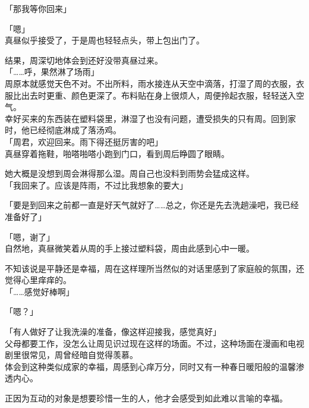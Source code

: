 「那我等你回来」

「嗯」\\

真昼似乎接受了，于是周也轻轻点头，带上包出门了。\\

\vspace{2\baselineskip}

结果，周深切地体会到还好没带真昼过来。\\

「……呼，果然淋了场雨」\\

周原本就感觉天色不对。不出所料，雨水接连从天空中滴落，打湿了周的衣服，衣服比出去时更重、颜色更深了。布料贴在身上很烦人，周便拎起衣服，轻轻送入空气。\\

幸好买来的东西装在塑料袋里，淋湿了也没有问题，遭受损失的只有周。回到家时，他已经彻底淋成了落汤鸡。\\

「周君，欢迎回来。雨下得还挺厉害的吧」\\

真昼穿着拖鞋，啪嗒啪嗒小跑到门口，看到周后睁圆了眼睛。

她大概是没想到周会淋得那么湿。周自己也没料到雨势会猛成这样。\\

「我回来了。应该是阵雨，不过比我想象的要大」

「要是到回来之前都一直是好天气就好了……总之，你还是先去洗趟澡吧，我已经准备好了」

「嗯，谢了」\\

自然地，真昼微笑着从周的手上接过塑料袋，周由此感到心中一暖。

不知该说是平静还是幸福，周在这样理所当然似的对话里感到了家庭般的氛围，还觉得心里痒痒的。\\

「……感觉好棒啊」

「嗯？」

「有人做好了让我洗澡的准备，像这样迎接我，感觉真好」\\

父母都要工作，没怎么让周见识过现在这样的场面。不过，这种场面在漫画和电视剧里很常见，周曾经暗自觉得羡慕。\\

体会到这种类似成家的幸福，周感到心痒万分，同时又有一种春日暖阳般的温馨渗透内心。

正因为互动的对象是想要珍惜一生的人，他才会感受到如此难以言喻的幸福。\\

